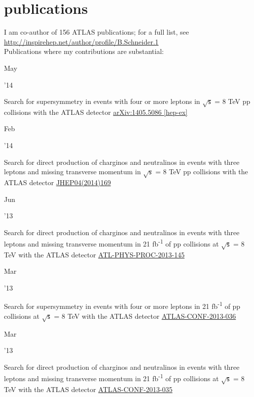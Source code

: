 \documentclass[]{cv} %
\begin{document}
\section{publications}
\begin{entrylist}

  \entry
  {}
  {I am co-author of 156 ATLAS publications; for a full list, see \\
\href{http://inspirehep.net/author/profile/B.Schneider.1}{http://inspirehep.net/author/profile/B.Schneider.1}\\
Publications where my contributions are substantial:}
{}
  {\vspace*{\spacingPubs}}

  \entry
  {\parbox[t]{\parboxWidthOne}{May}\parbox[t]{\parboxWidthTwo}{\hfill '14}}
  {Search for supersymmetry in events with four or more leptons in $\sqrt{\mathsf{s}}$ = 8 TeV pp collisions with the ATLAS detector}
  {\href{http://arxiv.org/abs/1405.5086}{arXiv:1405.5086 [hep-ex]}}
  {\vspace*{\spacingPubs}}

  \entry
  {\parbox[t]{\parboxWidthOne}{Feb}\parbox[t]{\parboxWidthTwo}{\hfill '14}}
  {Search for direct production of charginos and neutralinos in events with three leptons and missing transverse momentum in $\sqrt{\mathsf{s}}$ =
  8 TeV pp collisions with the ATLAS detector}
  {\href{http://dx.doi.org/10.1007/JHEP04(2014)169}{JHEP04(2014)169}}
  {\vspace*{\spacingPubs}}

  \entry
  {\parbox[t]{\parboxWidthOne}{Jun}\parbox[t]{\parboxWidthTwo}{\hfill '13}}
  {Search for direct production of charginos and neutralinos in events with three leptons and missing transverse momentum in 21
    fb\textsuperscript{-1} of pp collisions at $\sqrt{\mathsf{s}}$ = 8 TeV with the ATLAS detector}
  {\href{https://cds.cern.ch/record/1554811}{ATL-PHYS-PROC-2013-145}}
  {\vspace*{\spacingPubs}}

  \entry
  {\parbox[t]{\parboxWidthOne}{Mar}\parbox[t]{\parboxWidthTwo}{\hfill '13}}
  {Search for supersymmetry in events with four or more leptons in 21 fb\textsuperscript{-1} of pp collisions at
  $\sqrt{\mathsf{s}}$ = 8 TeV with the ATLAS detector}
{\href{https://cds.cern.ch/record/1532429}{ATLAS-CONF-2013-036}}
{\vspace*{\spacingPubs}}

  \entry
  {\parbox[t]{\parboxWidthOne}{Mar}\parbox[t]{\parboxWidthTwo}{\hfill '13}}
  {Search for direct production of charginos and neutralinos in events with three leptons and missing transverse momentum in 21
    fb\textsuperscript{-1} of pp collisions at $\sqrt{\mathsf{s}}$ = 8 TeV with the ATLAS detector}
  {\href{https://cds.cern.ch/record/1532426}{ATLAS-CONF-2013-035}}
  {\vspace*{\spacingPubs}}


\end{entrylist}
\end{document}

